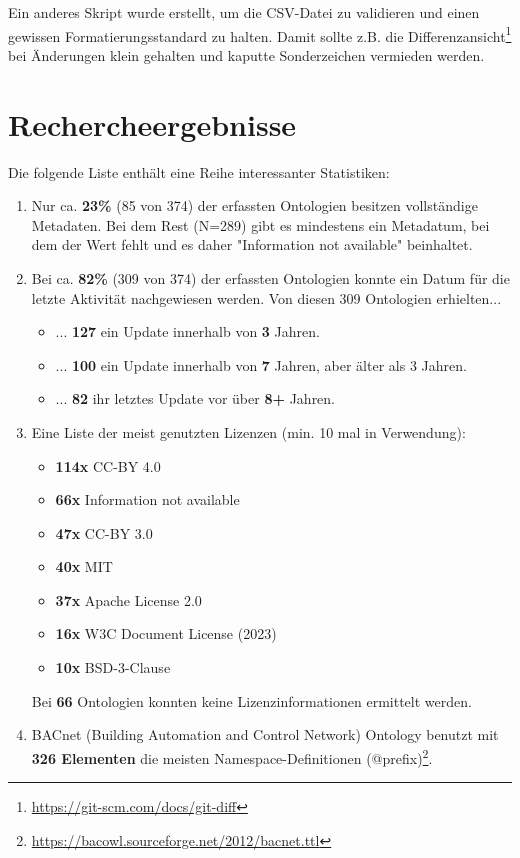 \documentclass{article}
\begin{document}
Ein anderes Skript wurde erstellt, um die CSV-Datei zu validieren und einen gewissen Formatierungsstandard zu halten.
Damit sollte z.B. die Differenzansicht\footnote{\url{https://git-scm.com/docs/git-diff}} bei Änderungen klein gehalten und kaputte Sonderzeichen vermieden werden.

\section{Rechercheergebnisse}

Die folgende Liste enthält eine Reihe interessanter Statistiken:

\begin{enumerate}
    \item Nur ca. \textbf{23\%} (85 von 374) der erfassten Ontologien besitzen vollständige Metadaten. Bei dem Rest (N=289) gibt es mindestens ein Metadatum, bei dem der Wert fehlt und es daher "Information not available" beinhaltet.
    \item Bei ca. \textbf{82\%} (309 von 374) der erfassten Ontologien konnte ein Datum für die letzte Aktivität nachgewiesen werden. Von diesen 309 Ontologien erhielten...
        \begin{itemize}
            \item ... \textbf{127} ein Update innerhalb von \textbf{3} Jahren.
            \item ... \textbf{100} ein Update innerhalb von \textbf{7} Jahren, aber älter als 3 Jahren.
            \item ... \textbf{82} ihr letztes Update vor über \textbf{8+} Jahren.
        \end{itemize}
    \item Eine Liste der meist genutzten Lizenzen (min. 10 mal in Verwendung):
        \begin{itemize}
            \item \textbf{114x} CC-BY 4.0
            \item \textbf{66x} Information not available
            \item \textbf{47x} CC-BY 3.0
            \item \textbf{40x} MIT
            \item \textbf{37x} Apache License 2.0
            \item \textbf{16x} W3C Document License (2023)
            \item \textbf{10x} BSD-3-Clause
        \end{itemize}
        Bei \textbf{66} Ontologien konnten keine Lizenzinformationen ermittelt werden.
    \item BACnet (Building Automation and Control Network) Ontology benutzt mit \textbf{326 Elementen} die meisten Namespace-Definitionen (@prefix)\footnote{\url{https://bacowl.sourceforge.net/2012/bacnet.ttl}}.
\end{enumerate}
\end{document}
